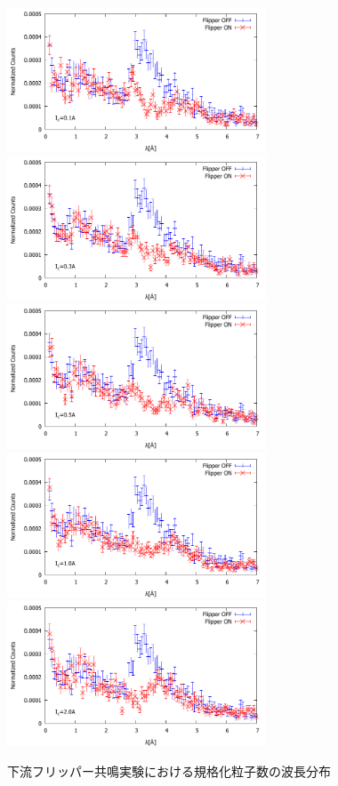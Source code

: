\begin{figure}[h]
\includegraphics[height=4.3cm]{resonance/analysis/Flipper2_NormalizedCounts_1A.pdf}
\includegraphics[height=4.3cm]{resonance/analysis/Flipper2_NormalizedCounts_3A.pdf}\\
\includegraphics[height=4.3cm]{resonance/analysis/Flipper2_NormalizedCounts_5A.pdf}
\includegraphics[height=4.3cm]{resonance/analysis/Flipper2_NormalizedCounts_10A.pdf}\\
\includegraphics[height=4.3cm]{resonance/analysis/Flipper2_NormalizedCounts_20A.pdf}
\caption{下流フリッパー共鳴実験における規格化粒子数の波長分布}\label{Resonance_fig_Flipper1_NormalizedCounts}
\end{figure}

